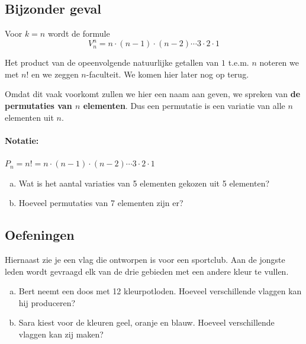 \documentclass[12pt,a4,twoside]{article}
\begin{document}
\subsection{Bijzonder geval}

Voor $k=n$ wordt de formule
\[V^n_n = n \cdot (n-1) \cdot (n-2) \cdots 3 \cdot 2 \cdot 1\]

Het product van de opeenvolgende natuurlijke getallen van $1$ t.e.m. $n$ noteren we met $n!$ en we zeggen $n$-faculteit. We komen hier later nog op terug.

Omdat dit vaak voorkomt zullen we hier een naam aan geven, we spreken van {\bf de permutaties van $n$ elementen}. Dus een permutatie is een variatie van alle $n$ elementen uit $n$.

\paragraph*{Notatie:} $P_n = n! = n \cdot (n-1) \cdot (n-2) \cdots 3 \cdot 2 \cdot 1$

\begin{oefening}
\begin{enumerate}[(a)]
  \item Wat is het aantal variaties van 5 elementen gekozen uit 5 elementen?
  \item Hoeveel permutaties van 7 elementen zijn er?
\end{enumerate}
\end{oefening}

\subsection{Oefeningen}

\begin{minipage}{0.7\textwidth}
\begin{oefening}
Hiernaast zie je een vlag die ontworpen is voor een sportclub. Aan de jongste leden wordt gevraagd elk van de drie gebieden met een andere kleur te vullen.
\begin{enumerate}[(a)]
  \item Bert neemt een doos met 12 kleurpotloden. Hoeveel verschillende vlaggen kan hij produceren?
  \item Sara kiest voor de kleuren geel, oranje en blauw. Hoeveel verschillende vlaggen kan zij maken?
\end{enumerate}
\end{oefening}
\end{minipage}
\begin{minipage}{0.25\textwidth}
\end{minipage}
\end{document}
